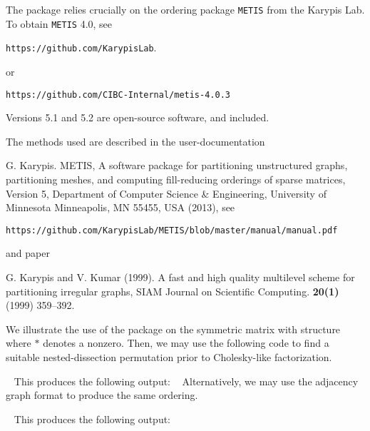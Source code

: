 \documentclass{galahad}
\begin{document}
\noindent
The package relies crucially on the ordering package {\tt METIS} from 
the Karypis Lab. To obtain {\tt METIS} 4.0, see

  {\tt https://github.com/KarypisLab}.

\noindent
or 

  {\tt https://github.com/CIBC-Internal/metis-4.0.3}

\noindent
Versions 5.1 and 5.2 are open-source software, and included.

\vspace*{1mm}

\galreferences
\vspace*{1mm}

\noindent
The methods used are described in the user-documentation
\vspace*{1mm}

\noindent
G. Karypis.
METIS, A software package for partitioning unstructured
graphs, partitioning meshes, and computing
fill-reducing orderings of sparse matrices, Version 5,
Department of Computer Science \& Engineering, University of Minnesota
Minneapolis, MN 55455, USA (2013), see

   {\tt https://github.com/KarypisLab/METIS/blob/master/manual/manual.pdf}

\noindent
and paper

\noindent
G. Karypis and V. Kumar (1999). 
A fast and high quality multilevel scheme for partitioning irregular graphs,
SIAM Journal on Scientific Computing. {\bf 20(1)} (1999) 359--392.


\galexample
We illustrate the use of the package on the symmetric matrix with structure
where $\ast$ denotes a nonzero.
Then, we may use the following code to find a suitable nested-dissection 
permutation prior to Cholesky-like factorization.

{\tt \small
\VerbatimInput{\packageexample}
}
\noindent
This produces the following output:
{\tt \small
\VerbatimInput{\packageresults}
}
\noindent
Alternatively, we may use the adjacency graph format to produce the same
ordering.

{\tt \small
\VerbatimInput{\packageexampleb}
}
\noindent
This produces the following output:
{\tt \small
\VerbatimInput{\packageresultsb}
}
\noindent
\end{document}
